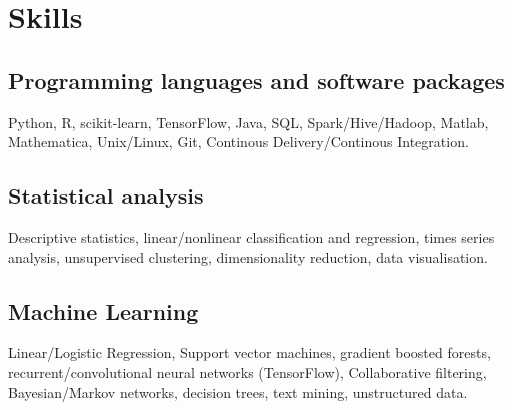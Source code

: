 \documentclass[10pt,a4paper]{article}
\renewenvironment{itemize}{
  \begin{list}{}{
    \setlength{\leftmargin}{1.5em}
    \setlength{\itemsep}{0.25em}
    \setlength{\parskip}{0pt}
    \setlength{\parsep}{0.25em}
  }
}{
  \end{list}
}
\begin{document}
\section*{Skills}



\subsection*{Programming languages and software packages}
\begin{itemize}
\item Python, R, scikit-learn, TensorFlow, Java, SQL, Spark/Hive/Hadoop, Matlab, Mathematica, Unix/Linux, Git, Continous Delivery/Continous Integration.
\end{itemize}

\subsection*{Statistical analysis}
\begin{itemize}
\item Descriptive statistics, linear/nonlinear classification and regression, times series analysis, unsupervised clustering, dimensionality reduction, data visualisation. 
\end{itemize}

\subsection*{Machine Learning}
\begin{itemize}
\item Linear/Logistic Regression, Support vector machines, gradient boosted forests, recurrent/convolutional neural networks (TensorFlow), Collaborative filtering, Bayesian/Markov networks, decision trees, text mining, unstructured data.
\end{itemize}
\end{document}
